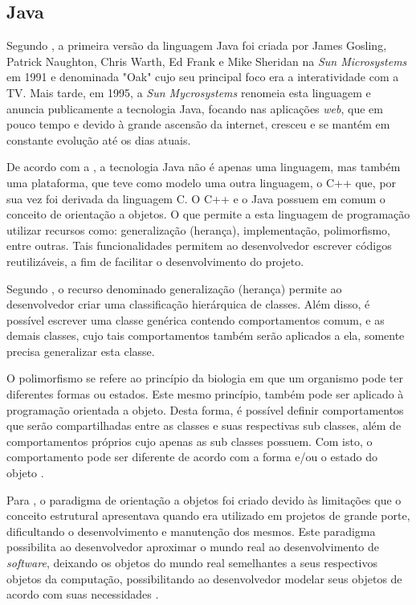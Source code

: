 \subsection{Java}

\par Segundo , a primeira versão da linguagem Java foi criada por James Gosling, Patrick Naughton, Chris Warth, Ed Frank e Mike Sheridan na \textit{Sun Microsystems} em 1991 e denominada "Oak" cujo seu principal foco era a interatividade com a TV. Mais tarde, em 1995, a \textit{Sun Mycrosystems} renomeia esta linguagem e anuncia publicamente a tecnologia Java, focando nas aplicações \textit{web}, que em pouco tempo e devido à grande ascensão da internet, cresceu e se mantém em constante evolução até os dias atuais.

\par De acordo com a , a tecnologia Java não é apenas uma linguagem, mas também uma plataforma, que teve como modelo uma outra linguagem, o C++ que, por sua vez foi derivada da linguagem C. O C++ e o Java possuem em comum o conceito de orientação a objetos. O que permite a esta linguagem de programação utilizar recursos como: generalização (herança), implementação, polimorfismo, entre outras. Tais funcionalidades permitem ao desenvolvedor escrever códigos reutilizáveis, a fim de facilitar o desenvolvimento do projeto.

Segundo , o recurso denominado generalização (herança) permite ao desenvolvedor criar uma classificação hierárquica de classes. Além disso, é possível escrever uma classe genérica contendo comportamentos comum, e as demais classes, cujo tais comportamentos também serão aplicados a ela, somente precisa generalizar esta classe.

O polimorfismo se refere ao princípio da biologia em que um organismo pode ter diferentes formas ou estados. Este mesmo princípio, também pode ser aplicado à programação orientada a objeto. Desta forma, é possível definir comportamentos que serão compartilhadas entre as classes e suas respectivas sub classes, além de comportamentos próprios cujo apenas as sub classes possuem. Com isto, o comportamento pode ser diferente de acordo com a forma e/ou o estado do objeto \cite{polymorphism_oracle}.

\par Para , o paradigma de orientação a objetos foi criado devido às limitações que o conceito estrutural apresentava quando era utilizado em projetos de grande porte, dificultando o desenvolvimento e manutenção dos mesmos. Este paradigma possibilita ao desenvolvedor aproximar o mundo real ao desenvolvimento de \textit{software}, deixando os objetos do mundo real semelhantes a seus respectivos objetos da computação, possibilitando ao desenvolvedor modelar seus objetos de acordo com suas necessidades \cite{tcc_univas_faria_aspectj_programacao_orientada_aspecto_java}.

